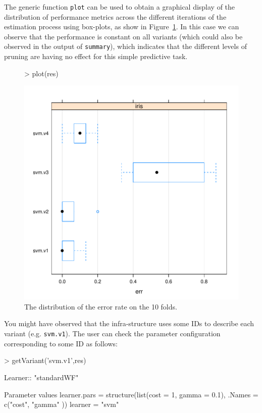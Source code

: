\documentclass[10pt,a4paper]{article}
\begin{document}
The generic function \texttt{plot} can be used to obtain a graphical
display of the distribution of performance metrics across the
different iterations of the estimation process using box-plots, as
show in Figure~\ref{fig:ex1Iris}. In this case we can observe that the
performance is constant on all variants (which could also be observed
in the output of \texttt{summary}), which indicates that the different
levels of pruning are having no effect for this simple predictive
task.

\begin{figure}[ht]
  \centering
\begin{Schunk}
\begin{Sinput}
> plot(res)
\end{Sinput}
\end{Schunk}
\includegraphics{compExps-005}
  \caption{The distribution of the error rate on the 10 folds.}
  \label{fig:ex1Iris}
\end{figure}

You might have observed that the infra-structure uses some IDs to
describe each variant (e.g. \texttt{svm.v1}). The user can check
the parameter configuration corresponding to some ID as follows:

\begin{Schunk}
\begin{Sinput}
> getVariant('svm.v1',res)
\end{Sinput}
\begin{Soutput}
Learner::  "standardWF" 

Parameter values
	 learner.pars  =  structure(list(cost = 1, gamma = 0.1), .Names = c("cost", "gamma" )) 
	 learner  =  "svm" 
\end{Soutput}
\end{Schunk}
\end{document}
